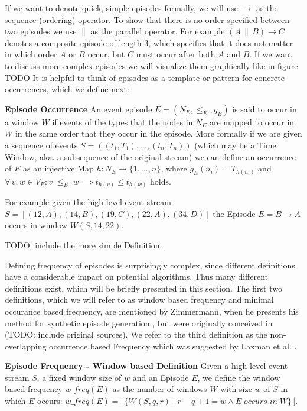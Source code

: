 If we want to denote quick, simple episodes formally, we will use $\rightarrow$ as the sequence (ordering) operator. To show that there is no order specified between two episodes we use $\|$ as the parallel operator. For example $(A \, \| \, B ) \rightarrow C$ denotes a composite episode of length 3, which specifies that it does not matter in which order $A$ or $B$ occur, but $C$ must occur after both $A$ and $B$. If we want to discuss more complex episodes we will visualize them graphically like in figure TODO \newline  
It is helpful to think of episodes as a template or pattern for concrete occurrences, which we define next:

\begin{mydef}
\textbf{Episode Occurrence} An event episode $E = (N_E,{\leq}_{E},g_E)$ is said to occur in a window $W$ if events of the types that the nodes in $N_E$ are mapped to occur in $W$ in the same order that they occur in the episode. More formally if we are given a sequence of events $S=((t_1,T_1),...,(t_n,T_n))$ (which may be a Time Window, aka. a subsequence of the original stream) we can define an occurrence of $E$ as an injective Map $h:N_E \rightarrow \{1,...,n\}$, where $g_E(n_i) = T_{h(n_i)}$ and $\forall \, v,w \in V_E : v \;{\leq}_{E}\; w \implies t_{h(v)} \leq t_{h(w)}$ holds.
\end{mydef}

For example given the high level event stream $S = [ (12,A) , (14,B) , (19,C) , (22,A), (34,D) ]$ the Episode $E = B \rightarrow A$ occurs in window $W(S,14,22)$. \newline \newline 

TODO: include the more simple Definition. \newline \newline


Defining frequency of episodes is surprisingly complex, since different definitions have a considerable impact on potential algorithms. Thus many different definitions exist, which will be briefly presented in this section. The first two definitions, which we will refer to as window based frequency and minimal occurance based frequency, are mentioned by Zimmermann, when he presents his method for synthetic episode generation \cite{zimmermann2012generating}, but were originally conceived in (TODO: include original sources). We refer to the third definition as the non-overlapping occurrence based Frequency which was suggested by Laxman et al. \cite{laxman2007fast}.
\begin{mydef}
\textbf{Episode Frequency - Window based Definition} Given a high level event stream $S$, a fixed window size of $w$ and an Episode $E$, we define the window based frequency $w\_freq(E)$ as the number of windows $W$ with size $w$ of $S$ in which $E$ occurs: $w\_freq(E) = |\,\{W(S,q,r) \mid r-q+1 = w \land E \;occurs\; in\; W \}\,|$.
\end{mydef}

